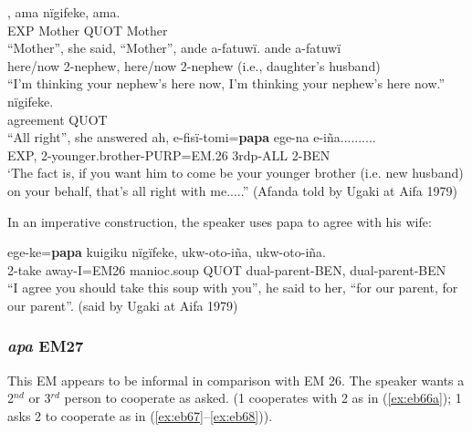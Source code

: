 \documentclass[output=paper]{langsci/langscibook}
\begin{document}

\begin{exe}
\ex \label{ex:eb64}
	\begin{xlist}
	\ex 
	, ama nïgifeke, ama.\\
	EXP Mother QUOT Mother\\
	\trans “Mother”, she said, “Mother”,
	\ex 
	\gll ande a-fatuwï. ande a-fatuwï\\
	here/now 2-nephew, here/now 2-nephew (i.e., daughter’s husband)\\
	\trans “I’m thinking your nephew’s here now, I’m thinking your nephew’s here now.”
	\ex
	 nïgifeke.\\
	agreement QUOT\\
	\trans “All right”, she answered
	\ex
	\gll ah, e-fisï-tomi=\textbf{papa} ege-na e-iña..........\\
	EXP, 2-younger.brother-PURP=EM.26 3rdp-ALL 2-BEN\\
	\trans ‘The fact is,  if you want him to come  be your  younger brother (i.e. new husband) on your behalf,  that’s all right with me.....” (Afanda told by Ugaki at Aifa 1979)
\end{xlist}
\end{exe}

In an imperative construction, the  speaker uses papa to agree with his wife:

\begin{exe}
	\ex \label{ex:eb65}
	\gll ege-ke=\textbf{papa} kuigiku nïgïfeke, ukw-oto-iña, ukw-oto-iña.\\
	2-take away-I=EM26 manioc.soup QUOT dual-parent-BEN, dual-parent-BEN\\
	\trans “I agree you should take this soup with you”, he said to her, “for our parent, for our parent”. (said by Ugaki at Aifa 1979)
\end{exe}

\subsubsection{\textit{apa} EM27} 
This EM appears to be informal in comparison with EM 26.  The speaker wants a 2$^{nd}$ or 3$^{rd}$ person to cooperate as asked. (1 cooperates with 2 as in (\ref{ex:eb66a}); 1 asks 2 to cooperate as in (\ref{ex:eb67}--\ref{ex:eb68})).  
\end{document}
